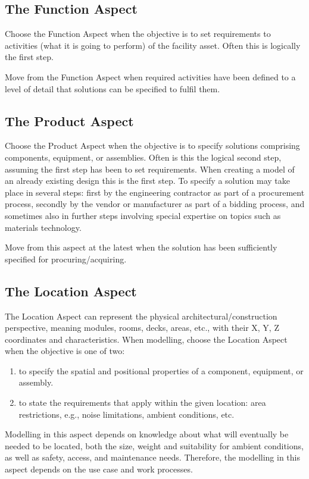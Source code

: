 \documentclass[../main.tex]{subfiles}
\begin{document}
\subsection{The Function Aspect}
Choose the Function Aspect when the objective is to set requirements to activities (what
it is going to perform) of the facility asset. Often this is logically the first step.

Move from the Function Aspect when required activities have been defined to a level of detail that solutions can
be specified to fulfil them.

\subsection{The Product Aspect}
Choose the Product Aspect when the objective is to specify solutions comprising
components, equipment, or assemblies. Often is this the logical second step, assuming the first step has been to set
requirements. When creating a model of an already existing design this is the first step. To specify a solution may
take place in several steps: first by the engineering contractor as part of a procurement process, secondly by the
vendor or manufacturer as part of a bidding process, and sometimes also in further steps involving special expertise
on topics such as materials technology.

Move from this aspect at the latest when the solution has been sufficiently specified for procuring/acquiring.

\subsection{The Location Aspect}
The Location Aspect can represent the physical architectural/construction
perspective, meaning modules, rooms, decks, areas, etc., with their X, Y, Z coordinates and characteristics. When
modelling, choose the Location Aspect when the objective is one of two:

\begin{enumerate}
  \item to specify the spatial and positional properties of a component, equipment, or assembly.
  \item to state the requirements that apply within the given location: area restrictions, e.g., noise limitations,
        ambient conditions, etc.
\end{enumerate}
Modelling in this aspect depends on knowledge about what will eventually be needed to be located, both the size,
weight and suitability for ambient conditions, as well as safety, access, and maintenance needs. Therefore, the
modelling in this aspect depends on the use case and work processes.
\end{document}
